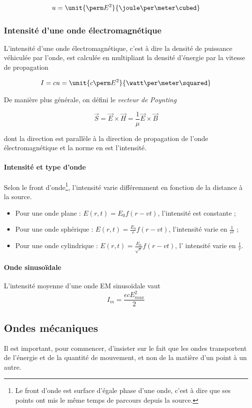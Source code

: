 $$u = \unit{\perm E^2}{\joule\per\meter\cubed}$$

\subsubsection{Intensité d'une onde électromagnétique}
L'intensité d'une onde électromagnétique, c'est à
dire la densité de puissance véhiculée par l'onde, est calculée
en multipliant la densité d'énergie par la vitesse de propagation

$$I = cu = \unit{c\perm E^2}{\watt\per\meter\squared}$$

De manière plus générale, on défini le \emph{vecteur de Poynting}

\[\vec{S} = \vec{E} \times \vec{H} = \frac{1}{\mu} \vec{E} \times \vec{B}\]

dont la direction est parallèle à la direction de propagation de l'onde électromagnétique
et la norme en est l'intensité.

\paragraph{Intensité et type d'onde}
Selon le front d'onde\footnote{Le front d'onde est surface d'égale phase d'une onde,
c'est à dire que ses points ont mis le même temps de parcours depuis la source.},
l'intensité varie différemment en fonction de la distance à la source.
\begin{itemize}
	\item Pour une onde plane : $E(r,t) = E_0f(r-vt)$, l'intensité est constante ;
	\item Pour une onde sphérique : $E(r,t) = \frac{E_0}{r}f(r-vt)$, l'intensité
	varie en $\frac{1}{r^2}$ ;
	\item Pour une onde cylindrique : $E(r,t) = \frac{E_0}{\sqrt{r}}f(r-vt)$, l'
	intensité varie en $\frac{1}{r}$.
\end{itemize}

\paragraph{Onde sinusoïdale} L'intensité moyenne d'une onde EM sinusoïdale vaut
\[I_m = \frac{\epsilon c E^2_{max}}{2}\]

\subsection{Ondes mécaniques}
Il est important, pour commencer, d'insister sur le fait
que les ondes transportent de l'énergie et de la quantité de mouvement,
et non de la matière d'un point à un autre.

